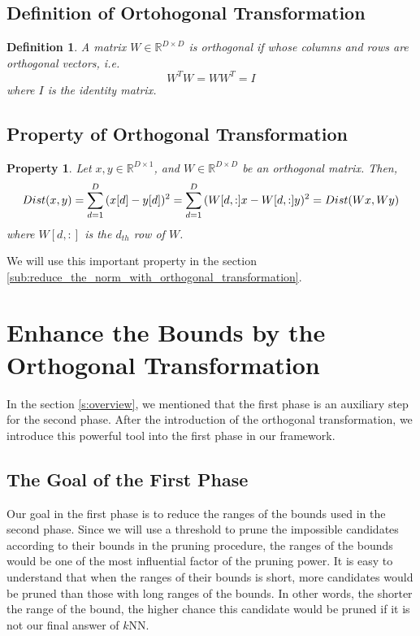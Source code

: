 \subsection{Definition of Ortohogonal Transformation}
\label{ss:ortho_def}
\newtheorem{Orthogonal}{\bf Definition}
\begin{Orthogonal}
A matrix $W \in\mathbb{R}^{D\times D}$ is orthogonal if whose columns and rows are orthogonal vectors, i.e.
\[
W^{T}W=WW^{T}=I
\]
where $I$ is the identity matrix.
\end{Orthogonal}

\subsection{Property of Orthogonal Transformation}
\label{ss:ortho_prop}
\newtheorem{ProOfOrthogonal}{\bf Property}
\begin{ProOfOrthogonal}
Let $x, y\in\mathbb{R}^{D\times 1}$, and $W\in\mathbb{R}^{D\times D}$ be an orthogonal matrix. Then,
\[
Dist(x,y)=\sum^D_{d=1}{(x[d]-y[d])^2} \\
=\sum^D_{d=1}{(W[d,:]x-W[d,:]y)^2}=Dist(Wx,Wy)
\]
where $W[d,:]$ is the $d_{th}$ row of $W$.
\end{ProOfOrthogonal}

We will use this important property in the section \ref{sub:reduce_the_norm_with_orthogonal_transformation}.

\section{Enhance the Bounds by the Orthogonal Transformation}
\label{s:ortho_bounds}
In the section \ref{s:overview}, we mentioned that the first phase is an auxiliary step for the second phase.  After the introduction of the orthogonal transformation, we introduce this powerful tool into the first phase in our framework.

\subsection{The Goal of the First Phase} %
\label{ss:the_goal_of_the_first_phase}

Our goal in the first phase is to reduce the ranges of the bounds used in the second phase.  Since we will use a threshold to prune the impossible candidates according to their bounds in the pruning procedure, the ranges of the bounds would be one of the most influential factor of the pruning power. It is easy to understand that when the ranges of their bounds is short, more candidates would be pruned than those with long ranges of the bounds.  In other words, the shorter the range of the bound, the higher chance this candidate would be pruned if it is not our final answer of $k$NN.  

